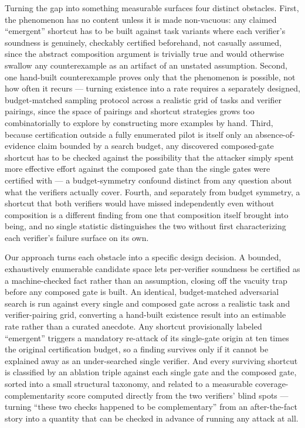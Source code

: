 \documentclass[11pt]{article}
\begin{document}
Turning the gap into something measurable surfaces four distinct obstacles. First, the phenomenon has no content unless it is made non-vacuous: any claimed ``emergent'' shortcut has to be built against task variants where each verifier's soundness is genuinely, checkably certified beforehand, not casually assumed, since the abstract composition argument is trivially true and would otherwise swallow any counterexample as an artifact of an unstated assumption. Second, one hand-built counterexample proves only that the phenomenon is possible, not how often it recurs --- turning existence into a rate requires a separately designed, budget-matched sampling protocol across a realistic grid of tasks and verifier pairings, since the space of pairings and shortcut strategies grows too combinatorially to explore by constructing more examples by hand. Third, because certification outside a fully enumerated pilot is itself only an absence-of-evidence claim bounded by a search budget, any discovered composed-gate shortcut has to be checked against the possibility that the attacker simply spent more effective effort against the composed gate than the single gates were certified with --- a budget-symmetry confound distinct from any question about what the verifiers actually cover. Fourth, and separately from budget symmetry, a shortcut that both verifiers would have missed independently even without composition is a different finding from one that composition itself brought into being, and no single statistic distinguishes the two without first characterizing each verifier's failure surface on its own.

Our approach turns each obstacle into a specific design decision. A bounded, exhaustively enumerable candidate space lets per-verifier soundness be certified as a machine-checked fact rather than an assumption, closing off the vacuity trap before any composed gate is built. An identical, budget-matched adversarial search is run against every single and composed gate across a realistic task and verifier-pairing grid, converting a hand-built existence result into an estimable rate rather than a curated anecdote. Any shortcut provisionally labeled ``emergent'' triggers a mandatory re-attack of its single-gate origin at ten times the original certification budget, so a finding survives only if it cannot be explained away as an under-searched single verifier. And every surviving shortcut is classified by an ablation triple against each single gate and the composed gate, sorted into a small structural taxonomy, and related to a measurable coverage-complementarity score computed directly from the two verifiers' blind spots --- turning ``these two checks happened to be complementary'' from an after-the-fact story into a quantity that can be checked in advance of running any attack at all.
\end{document}
